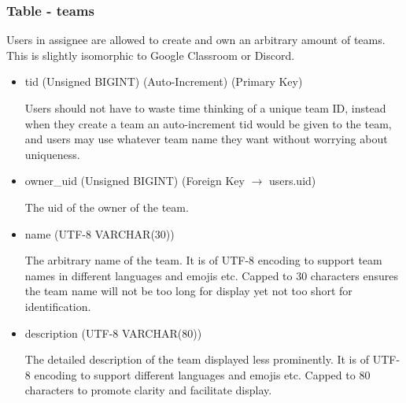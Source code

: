 \documentclass[12pt]{report}
\newcommand{\n}{\par}
\begin{document}
\subsubsection{Table - teams} \label{data-layer.design.team-system.teams}
Users in assignee are allowed to create and own an arbitrary amount of teams.
This is slightly isomorphic to Google Classroom or Discord.
\begin{itemize}
	\item tid (Unsigned BIGINT) (Auto-Increment) (Primary Key)\n
	      Users should not have to waste time thinking of a unique team ID,
	      instead when they create a team an auto-increment tid would be given to the team,
	      and users may use whatever team name they want without worrying about uniqueness.
	\item owner\_uid (Unsigned BIGINT) (Foreign Key $\rightarrow$ users.uid)\n
	      The uid of the owner of the team.
	\item name (UTF-8 VARCHAR(30))\n
	      The arbitrary name of the team.
	      It is of UTF-8 encoding to support team names in different languages and emojis etc.
	      Capped to 30 characters ensures the team name will not be too long for display yet not too short for identification.
	\item description (UTF-8 VARCHAR(80))\n
	      The detailed description of the team displayed less prominently.
	      It is of UTF-8 encoding to support different languages and emojis etc.
	      Capped to 80 characters to promote clarity and facilitate display.
\end{itemize}
\end{document}
